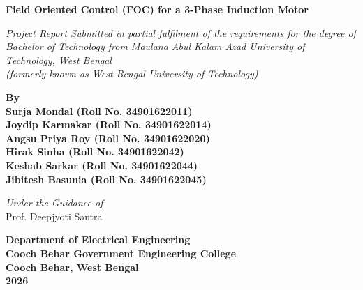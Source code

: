 \documentclass[12pt,a4paper]{report}
\begin{document}
\begin{titlepage}
    \begin{center}
        \vspace*{1cm}
        
        \Huge
        \textbf{Field Oriented Control (FOC) for a 3-Phase Induction Motor}
        
        \vspace{1.5cm}
        
        \Large
        \textit{Project Report Submitted in partial fulfilment of the requirements for the degree of\\
        Bachelor of Technology from Maulana Abul Kalam Azad University of Technology, West Bengal\\
        (formerly known as West Bengal University of Technology)}
        
        \vspace{1.5cm}
        
        \textbf{By}\\
        \vspace{0.5cm}
        \textbf{Surja Mondal (Roll No. 34901622011)}\\
        \textbf{Joydip Karmakar (Roll No. 34901622014)}\\
        \textbf{Angsu Priya Roy (Roll No. 34901622020)}\\
        \textbf{Hirak Sinha (Roll No. 34901622042)}\\
        \textbf{Keshab Sarkar (Roll No. 34901622044)}\\
        \textbf{Jibitesh Basunia (Roll No. 34901622045)}
        
        \vspace{1.5cm}
        
        \textit{Under the Guidance of}\\
        \vspace{0.5cm}
        Prof. Deepjyoti Santra
        
        \vfill
        
        \Large
        \textbf{Department of Electrical Engineering}\\
        \textbf{Cooch Behar Government Engineering College}\\
        \textbf{Cooch Behar, West Bengal}\\
        \vspace{0.5cm}
        \textbf{2026}
        
    \end{center}
\end{titlepage}
\end{document}
